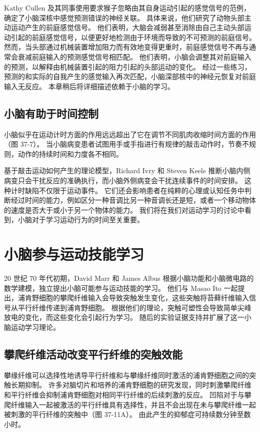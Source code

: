 Kathy Cullen 及其同事使用要求猴子忽略由其自身运动引起的感觉信号的范例，确定了小脑深核中感觉预测错误的神经关联。 具体来说，他们研究了动物头部主动运动产生的前庭感觉信号。 他们表明，大脑会减弱甚至消除由自己主动头部运动引起的前庭感觉信号，以便更好地检测由于环境而导致的不可预测的前庭信号。 然而，当头部通过机械装置增加阻力而有效地变得更重时，前庭感觉信号不再与通常会衰减前庭输入的预测感觉信号相匹配。 他们表明，小脑会调整其对前庭输入的预测，以解释由机械装置引起的阻力引起的头部运动的变化。 经过一些练习，预测的和实际的自我产生的感觉输入再次匹配，小脑深部核中的神经元恢复对前庭输入无反应。 本章稍后将详细描述依赖于小脑的学习。

\subsection{小脑有助于时间控制}

小脑似乎在运动计时方面的作用远远超出了它在调节不同肌肉收缩时间方面的作用（图 37-7）。 当小脑病变患者试图用手或手指进行有规律的敲击动作时，节奏不规则，动作的持续时间和力度各不相同。

基于敲击运动如何产生的理论模型，Richard Ivry 和 Steven Keele 推断小脑内侧病变只会干扰反应的准确执行，而小脑外侧病变会干扰连续事件的时间安排。 这种计时缺陷不仅限于运动事件。 它们还会影响患者在纯粹的心理或认知任务中判断经过时间的能力，例如区分一种音调比另一种音调长还是短，或者一个移动物体的速度是否大于或小于另一个物体的能力。 我们将在我们对运动学习的讨论中看到，小脑对于学习运动行为的时间至关重要。


\section{小脑参与运动技能学习}
20 世纪 70 年代初期，David Marr 和 James Albus 根据小脑功能和小脑微电路的数学建模，独立提出小脑可能参与运动技能的学习。 他们与 Masao Ito 一起提出，浦肯野细胞的攀爬纤维输入会导致突触发生变化，这些突触将苔藓纤维输入信号从平行纤维传递到浦肯野细胞。 根据他们的理论，突触可塑性会导致简单尖峰放电的变化，而这些变化会引起行为学习。 随后的实验证据支持并扩展了这一小脑运动学习理论。

\subsection{攀爬纤维活动改变平行纤维的突触效能}
攀缘纤维可以选择性地诱导平行纤维和与攀缘纤维同时激活的浦肯野细胞之间的突触长期抑制。 许多对脑切片和培养的浦肯野细胞的研究发现，同时刺激攀爬纤维和平行纤维会抑制浦肯野细胞对相同平行纤维的后续刺激的反应。 凹陷对于与攀爬纤维输入一起被激活的平行纤维具有选择性，并且不会出现在未与攀爬纤维一起被刺激的平行纤维的突触中（图 37-11A）。 由此产生的抑郁症可持续数分钟至数小时。

